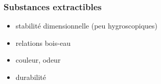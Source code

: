 \begin{multicols}{2}
\subsubsection{Substances extractibles}
	
\begin{itemize}
\item stabilité dimensionnelle (peu hygroscopiques)
\item relations bois-eau
\item couleur, odeur
\item durabilité
\end{itemize}
\end{multicols}


